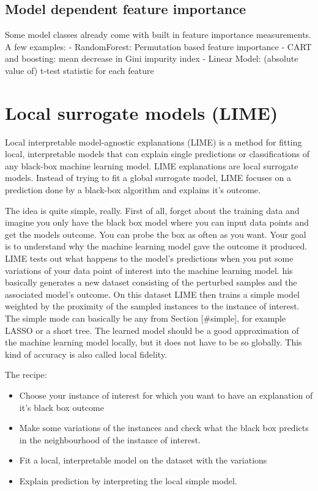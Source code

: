 \documentclass[12pt,]{krantz}
\providecommand{\tightlist}{%
  \setlength{\itemsep}{0pt}\setlength{\parskip}{0pt}}
\theoremstyle{definition}
\theoremstyle{definition}
\theoremstyle{definition}
\theoremstyle{remark}
\begin{document}
\subsection{Model dependent feature
importance}\label{model-dependent-feature-importance}

Some model classes already come with built in feature importance
measurements. A few examples: - RandomForest: Permutation based feature
importance - CART and boosting: mean decrease in Gini impurity index -
Linear Model: (absolute value of) t-test statistic for each feature

\section{Local surrogate models
(LIME)}\label{local-surrogate-models-lime}

Local interpretable model-agnostic explanations (LIME) is a method for
fitting local, interpretable models that can explain single predictions
or classifications of any black-box machine learning model. LIME
explanations are local surrogate models. Instead of trying to fit a
global surrogate model, LIME focuses on a prediction done by a black-box
algorithm and explains it's outcome.

The idea is quite simple, really. First of all, forget about the
training data and imagine you only have the black box model where you
can input data points and get the models outcome. You can probe the box
as often as you want. Your goal is to understand why the machine
learning model gave the outcome it produced. LIME tests out what happens
to the model's predictions when you put some variations of your data
point of interest into the machine learning model. his basically
generates a new dataset consisting of the perturbed samples and the
associated model's outcome. On this dataset LIME then trains a simple
model weighted by the proximity of the sampled instances to the instance
of interest. The simple mode can basically be any from Section
{[}\#simple{]}, for example LASSO or a short tree. The learned model
should be a good approximation of the machine learning model locally,
but it does not have to be so globally. This kind of accuracy is also
called local fidelity.

The recipe:

\begin{itemize}
\tightlist
\item
  Choose your instance of interest for which you want to have an
  explanation of it's black box outcome
\item
  Make some variations of the instances and check what the black box
  predicts in the neighbourhood of the instance of interest.
\item
  Fit a local, interpretable model on the dataset with the variations
\item
  Explain prediction by interpreting the local simple model.
\end{itemize}
\end{document}
